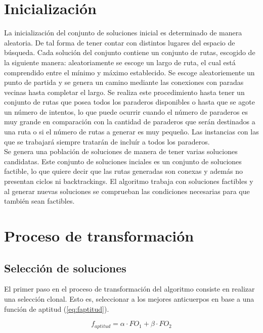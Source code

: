 \section{Inicialización}

La inicialización del conjunto de soluciones inicial es determinado de manera aleatoria. De tal forma de tener contar con distintos lugares del espacio de búsqueda. Cada solución del conjunto contiene un conjunto de rutas, escogido de la siguiente manera: aleatoriamente se escoge un largo de ruta, el cual está comprendido entre el mínimo y máximo establecido. Se escoge aleatoriemente un punto de partida y se genera un camino mediante las conexiones con paradas vecinas hasta completar el largo. Se realiza este procedimiento hasta tener un conjunto de rutas que posea todos los paraderos disponibles o hasta que se agote un número de intentos, lo que puede ocurrir cuando el número de paraderos es muy grande en comparación con la cantidad de paraderos que serán destinados a una ruta o si el número de rutas a generar es muy pequeño. Las instancias con las que se trabajará siempre tratarán de incluír a todos los paraderos.\\

Se genera una población de soluciones de manera de tener varias soluciones candidatas. Este conjunto de soluciones inciales es un conjunto de soluciones factible, lo que quiere decir que las rutas generadas son conexas y además no presentan ciclos ni backtrackings. El algoritmo trabaja con soluciones factibles y al generar nuevas soluciones se comprueban las condiciones necesarias para que también sean factibles. 

\section{Proceso de transformación}

\subsection{Selección de soluciones}

El primer paso en el proceso de transformación del algoritmo consiste en realizar una selección clonal. Esto es, seleccionar a los mejores anticuerpos en base a una función de aptitud (\ref{eq:faptitud}). 

\begin{equation}
\label{eq:faptitud}
f_{aptitud}=\alpha \cdot FO_1 + \beta \cdot FO_2
\end{equation}

